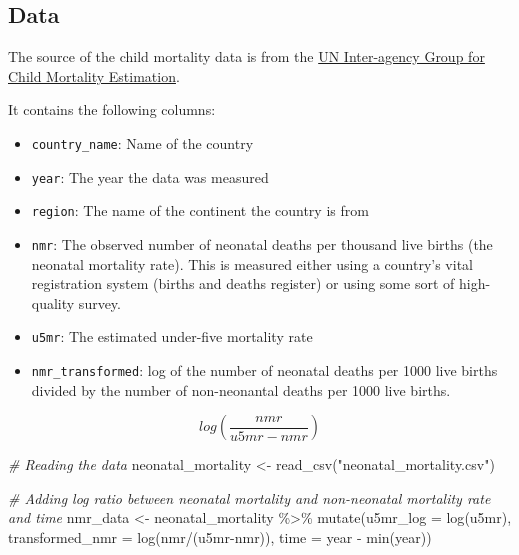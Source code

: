 \documentclass[
]{article}
\newenvironment{Shaded}{\begin{snugshade}}{\end{snugshade}}
\newcommand{\AttributeTok}[1]{\textcolor[rgb]{0.77,0.63,0.00}{#1}}
\newcommand{\CommentTok}[1]{\textcolor[rgb]{0.56,0.35,0.01}{\textit{#1}}}
\newcommand{\FunctionTok}[1]{\textcolor[rgb]{0.00,0.00,0.00}{#1}}
\newcommand{\NormalTok}[1]{#1}
\newcommand{\OtherTok}[1]{\textcolor[rgb]{0.56,0.35,0.01}{#1}}
\newcommand{\SpecialCharTok}[1]{\textcolor[rgb]{0.00,0.00,0.00}{#1}}
\newcommand{\StringTok}[1]{\textcolor[rgb]{0.31,0.60,0.02}{#1}}
\providecommand{\tightlist}{%
  \setlength{\itemsep}{0pt}\setlength{\parskip}{0pt}}
\begin{document}
\hypertarget{data}{%
\subsection{Data}\label{data}}

The source of the child mortality data is from the
\href{https://childmortality.org/data}{UN Inter-agency Group for Child
Mortality Estimation}.

It contains the following columns:

\begin{itemize}
\tightlist
\item
  \texttt{country\_name}: Name of the country
\item
  \texttt{year}: The year the data was measured
\item
  \texttt{region}: The name of the continent the country is from
\item
  \texttt{nmr}: The observed number of neonatal deaths per thousand live
  births (the neonatal mortality rate). This is measured either using a
  country's vital registration system (births and deaths register) or
  using some sort of high-quality survey.
\item
  \texttt{u5mr}: The estimated under-five mortality rate
\item
  \texttt{nmr\_transformed}: log of the number of neonatal deaths per
  1000 live births divided by the number of non-neonantal deaths per
  1000 live births.
\end{itemize}

\[log(\frac{nmr}{u5mr - nmr})\]

\begin{Shaded}
\begin{Highlighting}[]
\CommentTok{\# Reading the data}
\NormalTok{neonatal\_mortality }\OtherTok{\textless{}{-}} \FunctionTok{read\_csv}\NormalTok{(}\StringTok{"neonatal\_mortality.csv"}\NormalTok{)}

\CommentTok{\# Adding log ratio between neonatal mortality and non{-}neonatal mortality rate and time}
\NormalTok{nmr\_data }\OtherTok{\textless{}{-}}\NormalTok{ neonatal\_mortality }\SpecialCharTok{\%\textgreater{}\%} 
  \FunctionTok{mutate}\NormalTok{(}\AttributeTok{u5mr\_log =} \FunctionTok{log}\NormalTok{(u5mr), }
         \AttributeTok{transformed\_nmr =} \FunctionTok{log}\NormalTok{(nmr}\SpecialCharTok{/}\NormalTok{(u5mr}\SpecialCharTok{{-}}\NormalTok{nmr)),}
         \AttributeTok{time =}\NormalTok{ year }\SpecialCharTok{{-}} \FunctionTok{min}\NormalTok{(year))}
\end{Highlighting}
\end{Shaded}
\end{document}
